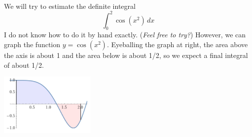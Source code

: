 \documentclass[11pt,fleqn]{article}
\begin{document}
\renewcommand{\headrulewidth}{0pt}
\newcommand{\blank}[1]{\rule{#1}{0.75pt}}
\newcommand{\bc}{\begin{center}}
\newcommand{\ec}{\end{center}}
\renewcommand{\d}{\displaystyle}

\vspace*{-0.7in}

\begin{center}
  \large
  \\
\end{center}

\bigskip
\begin{minipage}{0.55\textwidth}
We will try to estimate the definite integral
    $$\int_0^2 \cos(x^2) \,dx$$
I do not know how to do it by hand exactly.  (\emph{Feel free to try?})  However, we can graph the function $y=\cos(x^2)$.  Eyeballing the graph at right, the area above the axis is about 1 and the area below is about 1/2, so we expect a final integral of about 1/2.
\end{minipage}

\vspace{-45mm}
\hfill \includegraphics[width=0.35\textwidth]{figs/cosxx.png}
\end{document}
